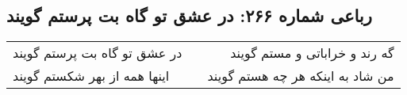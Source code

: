 \begin{center}
\section*{رباعی شماره ۲۶۶: در عشق تو گاه بت پرستم گویند}
\label{sec:sh266}
\begin{longtable}{l p{0.5cm} r}
در عشق تو گاه بت پرستم گویند
&&
گه رند و خراباتی و مستم گویند
\\
اینها همه از بهر شکستم گویند
&&
من شاد به اینکه هر چه هستم گویند
\\
\end{longtable}
\end{center}
